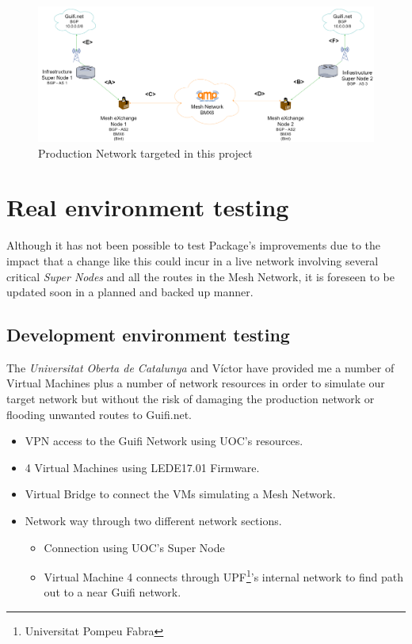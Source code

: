 \begin{landscape}

\begin{figure}[ht!]
        \centering
        \includegraphics[width=\hsize]{images/targetnet}
        \caption{Production Network targeted in this project}
        \label{fig:tarnet}
	\end{figure}
\end{landscape}
\newpage

\section{Real environment testing}
Although it has not been possible to test Package's improvements due to the impact that a change like this could incur in a live network involving several critical \textit{Super Nodes} and all the routes in the Mesh Network, it is foreseen to be updated soon in a planned and backed up manner.

\subsection{Development environment testing}
The \textit{Universitat Oberta de Catalunya} and V\'{i}ctor have provided me a number of Virtual Machines plus a number of network resources in order to simulate our target network but without the risk of damaging the production network or flooding unwanted routes to Guifi.net.

\begin{itemize}
    \item VPN access to the Guifi Network using UOC's resources.
    \item 4 Virtual Machines using LEDE17.01 Firmware.
    \item Virtual Bridge to connect the VMs simulating a Mesh Network.
    \item Network way through two different network sections.
    \begin{itemize}
        \item Connection using UOC's Super Node
        \item Virtual Machine 4 connects through UPF\footnote{Universitat Pompeu Fabra}'s internal network to find path out to a near Guifi network.
    \end{itemize}
\end{itemize}

